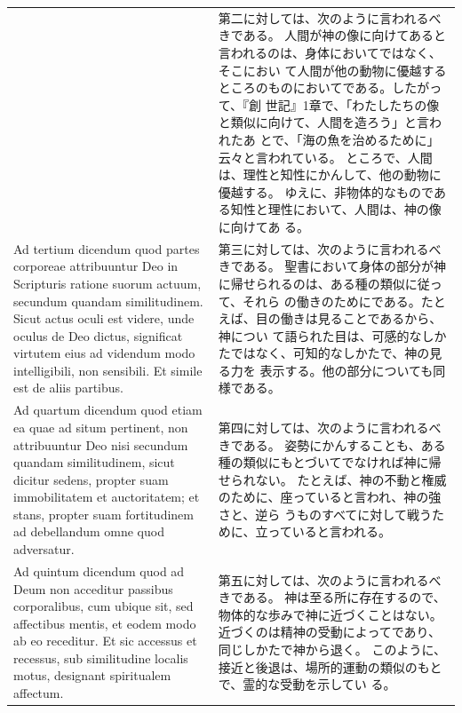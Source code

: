 \documentclass[paper=a4paper,fontsize=10pt,jafontsize=9pt,titlepage]{jlreq}
\begin{document}
\begin{longtable}{p{21em}p{21em}}
&
第二に対しては、次のように言われるべきである。
人間が神の像に向けてあると言われるのは、身体においてではなく、そこにおい
 て人間が他の動物に優越するところのものにおいてである。したがって、『創
 世記』1章で、「わたしたちの像と類似に向けて、人間を造ろう」と言われたあ
 とで、「海の魚を治めるために」云々と言われている。
ところで、人間は、理性と知性にかんして、他の動物に優越する。
ゆえに、非物体的なものである知性と理性において、人間は、神の像に向けてあ
 る。

\\




Ad tertium dicendum quod partes corporeae
 attribuuntur Deo in Scripturis ratione suorum actuum, secundum quandam
 similitudinem. Sicut actus oculi est videre, unde oculus de Deo dictus,
 significat virtutem eius ad videndum modo intelligibili, non
 sensibili. Et simile est de aliis partibus.


&

第三に対しては、次のように言われるべきである。
聖書において身体の部分が神に帰せられるのは、ある種の類似に従って、それら
 の働きのためにである。たとえば、目の働きは見ることであるから、神につい
 て語られた目は、可感的なしかたではなく、可知的なしかたで、神の見る力を
 表示する。他の部分についても同様である。


\\



Ad quartum dicendum quod etiam ea quae ad
 situm pertinent, non attribuuntur Deo nisi secundum quandam
 similitudinem, sicut dicitur sedens, propter suam immobilitatem et
 auctoritatem; et stans, propter suam fortitudinem ad debellandum omne
 quod adversatur.


&

第四に対しては、次のように言われるべきである。
姿勢にかんすることも、ある種の類似にもとづいてでなければ神に帰せられない。
 たとえば、神の不動と権威のために、座っていると言われ、神の強さと、逆ら
 うものすべてに対して戦うために、立っていると言われる。

\\


Ad quintum dicendum quod ad Deum non acceditur
 passibus corporalibus, cum ubique sit, sed affectibus mentis, et eodem
 modo ab eo receditur. Et sic accessus et recessus, sub similitudine
 localis motus, designant spiritualem affectum.


&

第五に対しては、次のように言われるべきである。
神は至る所に存在するので、物体的な歩みで神に近づくことはない。
近づくのは精神の受動によってであり、同じしかたで神から退く。
このように、接近と後退は、場所的運動の類似のもとで、霊的な受動を示してい
 る。




\end{longtable}
\end{document}
